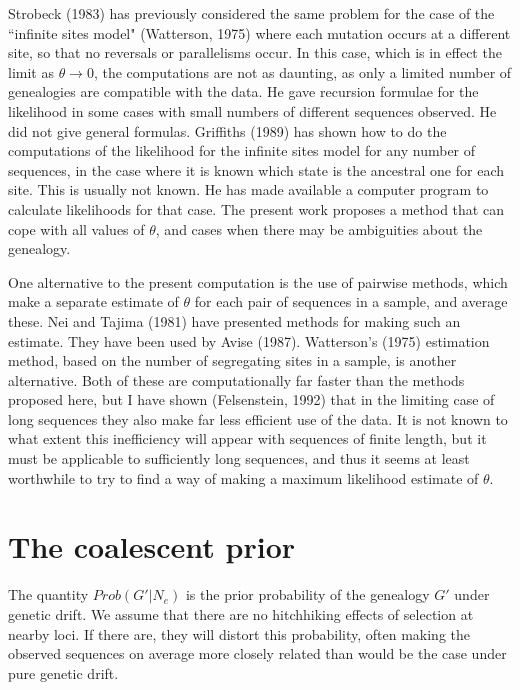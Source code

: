 Strobeck (1983) has previously considered the same problem for the case of
the ``infinite sites model" (Watterson, 1975) where each mutation occurs
at a different site, so that no reversals or parallelisms occur.  In this
case, which is in effect the limit as $\theta \rightarrow 0$, the computations
are not as daunting, as only a limited number of genealogies are compatible
with the data.  He gave recursion formulae for the likelihood in some cases
with small numbers of different sequences observed.  He did not give
general formulas.  Griffiths (1989) has shown how to do the computations of
the likelihood for the infinite sites model for any number of sequences, in
the case where it is known which state is the ancestral one for each
site.  This is usually not known.  He has made available a computer program
to calculate likelihoods for that case.  The present work proposes a
method that can cope with all values of $\theta$, and cases when there may be
ambiguities about the genealogy.

One alternative to the present computation is the use of pairwise methods, 
which make a separate estimate of $\theta$ for each pair of sequences in
a sample, and average these.  Nei and Tajima (1981) have presented methods
for making such an estimate.  They have been used by Avise (1987).  Watterson's
(1975) estimation method, based on
the number of segregating sites in a sample, is another alternative.  Both of
these are computationally far faster than the methods proposed here, but I
have shown (Felsenstein, 1992) that in the limiting case of long sequences
they also make far less efficient use of the data.  It is not known to what
extent this inefficiency will appear with sequences of finite length, but it
must be applicable to sufficiently long sequences, and thus it
seems at least worthwhile to try to find a way of making a maximum likelihood
estimate of $\theta$.
\bigskip

\section{The coalescent prior}


The quantity $Prob(G' | N_e)$ is the prior probability of the genealogy $G'$
under genetic drift.  We assume that there are no hitchhiking effects of
selection at nearby loci.  If there are, they will distort this probability,
often making the observed sequences on average more closely related than
would be the case under pure genetic drift.

